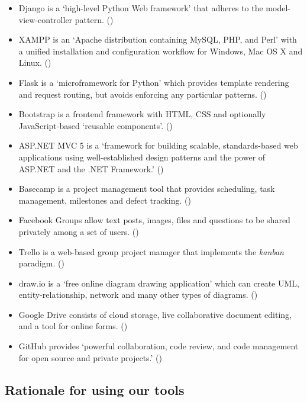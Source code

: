 \documentclass[a4paper,titlepage,12pt]{article}
\begin{document}
\begin{itemize}
	\item Django is a `high-level Python Web framework' that adheres to the
	      model-view-controller pattern.
	      (\cite{Django2014})
	\item XAMPP is an `Apache distribution containing MySQL, PHP, and Perl'
	      with a unified installation and configuration workflow for
	      Windows, Mac OS X and Linux.
	      (\cite{ApacheFriends2014})
	\item Flask is a `microframework for Python' which provides template
	      rendering and request routing, but avoids enforcing any
	      particular patterns.
	      (\cite{Ronacher2014})
	\item Bootstrap is a frontend framework with HTML, CSS and optionally
	      JavaScript-based `reusable components'.
	      (\cite{Twitter2014})
	\item ASP.NET MVC 5 is a `framework for building scalable,
	      standards-based web applications using well-established design
	      patterns and the power of ASP.NET and the .NET Framework.'
	      (\cite{Microsoft2014})
	\item Basecamp is a project management tool that provides scheduling,
	      task management, milestones and defect tracking.
	      (\cite{37signals2004})
	\item Facebook Groups allow text posts, images, files and questions
	      to be shared privately among a set of users.
	      (\cite{Facebook2014})
	\item Trello is a web-based group project manager that implements the
	      \textit{kanban} paradigm.
	      (\cite{FogCreek2014})
	\item draw.io is a `free online diagram drawing application' which can
	      create UML, entity-relationship, network and many other types
	      of diagrams.
	      (\cite{JGraph2014})
	\item Google Drive consists of cloud storage, live collaborative
	      document editing, and a tool for online forms.
	      (\cite{Google2014})
	\item GitHub provides `powerful collaboration, code review, and code
	      management for open source and private projects.'
	      (\cite{GitHub2014})
\end{itemize}

\newpage

\subsection{Rationale for using our tools}
\end{document}
